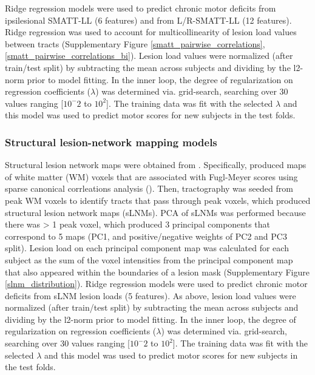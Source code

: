 \documentclass[10pt]{article}
\begin{document}
Ridge regression models were used to predict chronic motor deficits from ipsilesional SMATT-LL (6 features) and from L/R-SMATT-LL (12 features). Ridge regression was used to account for multicollinearity of lesion load values between tracts (Supplementary Figure \ref{smatt_pairwise_correlations}, \ref{smatt_pairwise_correlations_bi}). Lesion load values were normalized (after train/test split) by subtracting the mean across subjects and dividing by the l2-norm prior to model fitting. In the inner loop, the degree of regularization on regression coefficients ($\lambda$) was determined via. grid-search, searching over 30 values ranging [$10^-2$ to $10^2$]. The training data was fit with the selected $\lambda$ and this model was used to predict motor scores for new subjects in the test folds.

\subsubsection*{Structural lesion-network mapping models}
Structural lesion network maps were obtained from \cite{Bowren2022-rs}. Specifically, \cite{Bowren2022-rs} produced maps of white matter (WM) voxels that are associated with Fugl-Meyer scores using sparse canonical corrleations analysis (\cite{Pustina2018-xv}). Then, tractography was seeded from peak WM voxels to identify tracts that pass through peak voxels, which produced structural lesion network maps (sLNMs). PCA of sLNMs was performed because there was > 1 peak voxel, which produced 3 principal components that correspond to 5 maps (PC1, and positive/negative weights of PC2 and PC3 split). Lesion load on each principal component map was calculated for each subject as the sum of the voxel intensities from the principal component map that also appeared within the boundaries of a lesion mask (Supplementary Figure \ref{slnm_distribution}). Ridge regression models were used to predict chronic motor deficits from sLNM lesion loads (5 features). As above, lesion load values were normalized (after train/test split) by subtracting the mean across subjects and dividing by the l2-norm prior to model fitting. In the inner loop, the degree of regularization on regression coefficients ($\lambda$) was determined via. grid-search, searching over 30 values ranging [$10^-2$ to $10^2$]. The training data was fit with the selected $\lambda$ and this model was used to predict motor scores for new subjects in the test folds. 
\end{document}
